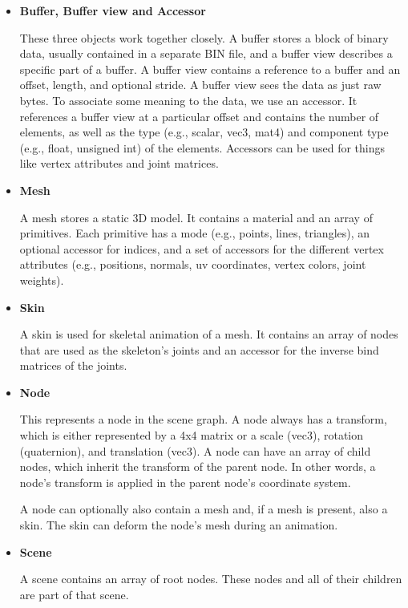 \begin{itemize}
    \item \textbf{Buffer, Buffer view and Accessor}

    These three objects work together closely. A buffer stores a block of binary data, usually contained in a separate BIN file, and a buffer view describes a specific part of a buffer. A buffer view contains a reference to a buffer and an offset, length, and optional stride. A buffer view sees the data as just raw bytes. To associate some meaning to the data, we use an accessor. It references a buffer view at a particular offset and contains the number of elements, as well as the type (e.g., scalar, vec3, mat4) and component type (e.g., float, unsigned int) of the elements. Accessors can be used for things like vertex attributes and joint matrices.

    \item \textbf{Mesh}

    A mesh stores a static 3D model. It contains a material and an array of primitives. Each primitive has a mode (e.g., points, lines, triangles), an optional accessor for indices, and a set of accessors for the different vertex attributes (e.g., positions, normals, uv coordinates, vertex colors, joint weights).

    \item \textbf{Skin}

    A skin is used for skeletal animation of a mesh. It contains an array of nodes that are used as the skeleton's joints and an accessor for the inverse bind matrices of the joints.

    \item \textbf{Node}

    This represents a node in the scene graph. A node always has a transform, which is either represented by a 4x4 matrix or a scale (vec3), rotation (quaternion), and translation (vec3). A node can have an array of child nodes, which inherit the transform of the parent node. In other words, a node's transform is applied in the parent node's coordinate system.

    A node can optionally also contain a mesh and, if a mesh is present, also a skin. The skin can deform the node's mesh during an animation.

    \item \textbf{Scene}

    A scene contains an array of root nodes. These nodes and all of their children are part of that scene.


\end{itemize}

